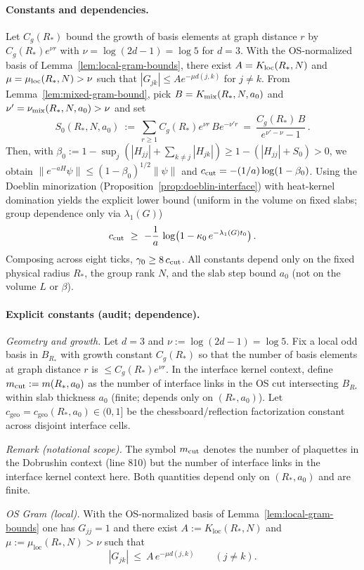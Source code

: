 \documentclass[11pt]{amsart}
\theoremstyle{plain}
\theoremstyle{definition}
\theoremstyle{remark}
\begin{document}
\paragraph{Constants and dependencies.}
Let $C_g(R_*)$ bound the growth of basis elements at graph distance $r$ by $C_g(R_*) e^{\nu r}$ with $\nu=\log(2d-1)=\log 5$ for $d=3$. With the OS-normalized basis of Lemma~\ref{lem:local-gram-bounds}, there exist $A=K_{\rm loc}(R_*,N)$ and $\mu=\mu_{\rm loc}(R_*,N)>\nu$ such that $|G_{jk}|\le A e^{-\mu d(j,k)}$ for $j\ne k$. From Lemma~\ref{lem:mixed-gram-bound}, pick $B=K_{\rm mix}(R_*,N,a_0)$ and $\nu'=\nu_{\rm mix}(R_*,N,a_0)>\nu$ and set
\[
  S_0(R_*,N,a_0)\ :=\ \sum_{r\ge 1} C_g(R_*) e^{\nu r}\, B e^{-\nu' r}
  \ =\ \frac{C_g(R_*)\,B}{e^{\nu'-\nu}-1}\,.
\]
Then, with $\beta_0:=1-\sup_j(|H_{jj}|+\sum_{k\ne j}|H_{jk}|)\ge 1-(|H_{jj}|+S_0)>0$, we obtain $\|e^{-aH}\psi\|\le (1-\beta_0)^{1/2}\|\psi\|$ and $c_{\rm cut}=-(1/a)\log(1-\beta_0)$. Using the Doeblin minorization (Proposition~\ref{prop:doeblin-interface}) with heat-kernel domination yields the explicit lower bound (uniform in the volume on fixed slabs; group dependence only via $\lambda_1(G)$)
\[
  c_{\rm cut}\ \ge\ -\frac{1}{a}\,\log\bigl(1-\kappa_0\,e^{-\lambda_1(G) t_0}\bigr)\,.
\]
Composing across eight ticks, $\gamma_0\ge 8\,c_{\rm cut}$. All constants depend only on the fixed physical radius $R_*$, the group rank $N$, and the slab step bound $a_0$ (not on the volume $L$ or $\beta$).
\paragraph{Explicit constants (audit; dependence).}
\emph{Geometry and growth.} Let $d=3$ and $\nu:=\log(2d-1)=\log 5$. Fix a local odd basis in $B_{R_*}$ with growth constant $C_g(R_*)$ so that the number of basis elements at graph distance $r$ is $\le C_g(R_*) e^{\nu r}$. In the interface kernel context, define $m_{\rm cut}:=m(R_*,a_0)$ as the number of interface links in the OS cut intersecting $B_{R_*}$ within slab thickness $a_0$ (finite; depends only on $(R_*,a_0)$). Let $c_{\mathrm{geo}}=c_{\mathrm{geo}}(R_*,a_0)\in(0,1]$ be the chessboard/reflection factorization constant across disjoint interface cells.

\emph{Remark (notational scope).} The symbol $m_{\rm cut}$ denotes the number of plaquettes in the Dobrushin context (line 810) but the number of interface links in the interface kernel context here. Both quantities depend only on $(R_*,a_0)$ and are finite.

\emph{OS Gram (local).} With the OS-normalized basis of Lemma~\ref{lem:local-gram-bounds} one has $G_{jj}=1$ and there exist $A:=K_{\mathrm{loc}}(R_*,N)$ and $\mu:=\mu_{\mathrm{loc}}(R_*,N)>\nu$ such that
\[
  |G_{jk}|\ \le\ A\,e^{-\mu d(j,k)}\qquad (j\ne k).
\]
\end{document}
